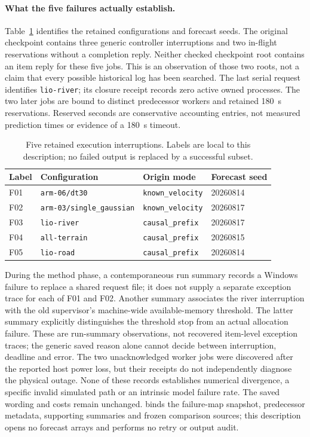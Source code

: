 \documentclass[11pt]{article}
\begin{document}
\paragraph{What the five failures actually establish.}
Table~\ref{tab:retained-failures} identifies the retained configurations and
forecast seeds. The original checkpoint contains three generic controller
interruptions and two in-flight reservations without a completion reply.
Neither checked checkpoint root contains an item reply for these five jobs.
This is an observation of those two roots, not a claim that every possible
historical log has been searched. The last serial request identifies
\texttt{lio-river}; its closure receipt records zero active owned processes.
The two later jobs are bound to distinct predecessor workers and retained
180~s reservations. Reserved seconds are conservative accounting entries,
not measured prediction times or evidence of a 180~s timeout.

\begin{table}[htbp]
\centering\small
\caption{Five retained execution interruptions. Labels are local to this
description; no failed output is replaced by a successful subset.}
\label{tab:retained-failures}
\begin{tabular}{llll}
\toprule
Label & Configuration & Origin mode & Forecast seed\\
\midrule
F01 & \texttt{arm-06/dt30} & \texttt{known\_velocity} & 20260814\\
F02 & \texttt{arm-03/single\_gaussian} & \texttt{known\_velocity} & 20260817\\
F03 & \texttt{lio-river} & \texttt{causal\_prefix} & 20260817\\
F04 & \texttt{all-terrain} & \texttt{causal\_prefix} & 20260815\\
F05 & \texttt{lio-road} & \texttt{causal\_prefix} & 20260814\\
\bottomrule
\end{tabular}
\end{table}

During the method phase, a contemporaneous run summary records a Windows
failure to replace a shared request file; it does not supply a separate
exception trace for each of F01 and F02. Another summary associates the
river interruption with the old supervisor's machine-wide available-memory threshold. The
latter summary explicitly distinguishes the threshold stop from an actual
allocation failure. These are run-summary observations, not recovered
item-level exception traces; the generic saved reason alone cannot decide
between interruption, deadline and error. The two unacknowledged worker jobs
were discovered after the reported host power loss, but their receipts do
not independently diagnose the physical outage. None of these records
establishes numerical divergence, a specific invalid simulated path or an
intrinsic model failure rate. The saved wording and costs remain unchanged.
 binds the failure-map snapshot,
predecessor metadata, supporting summaries and frozen comparison sources;
this description opens no forecast arrays and performs no retry or output audit.
\end{document}
